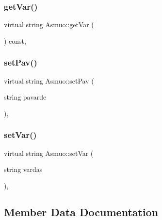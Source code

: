 \mbox{\label{class_asmuo_a6d44b2f0683d418719691813482d7973}} 
\subsubsection{\texorpdfstring{getVar()}{getVar()}}
{\footnotesize\ttfamily virtual string Asmuo\+::get\+Var (\begin{DoxyParamCaption}{ }\end{DoxyParamCaption}) const\hspace{0.3cm}{\ttfamily [inline]}, {\ttfamily [virtual]}}

\mbox{\label{class_asmuo_a85b9da20a6a0231e590e3c080fa35411}} 
\subsubsection{\texorpdfstring{setPav()}{setPav()}}
{\footnotesize\ttfamily virtual string Asmuo\+::set\+Pav (\begin{DoxyParamCaption}\item[{string}]{pavarde }\end{DoxyParamCaption})\hspace{0.3cm}{\ttfamily [inline]}, {\ttfamily [virtual]}}

\mbox{\label{class_asmuo_af4be3dfa7fff332ed2d79751a9f4d48b}} 
\subsubsection{\texorpdfstring{setVar()}{setVar()}}
{\footnotesize\ttfamily virtual string Asmuo\+::set\+Var (\begin{DoxyParamCaption}\item[{string}]{vardas }\end{DoxyParamCaption})\hspace{0.3cm}{\ttfamily [inline]}, {\ttfamily [virtual]}}



\subsection{Member Data Documentation}
\mbox{\label{class_asmuo_a57565486ef558917d1cea576ccdfdad8}} 
